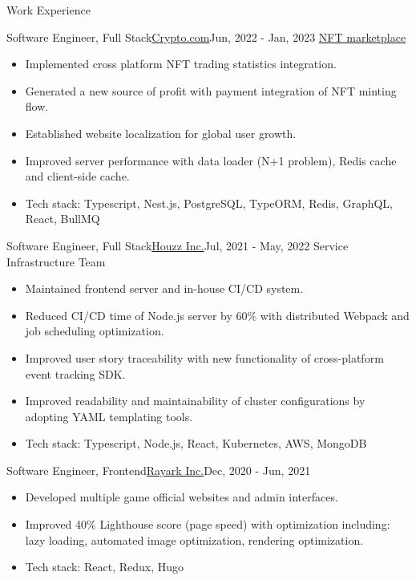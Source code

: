 \documentclass[]{mcdowellcv}
\begin{document}
	\begin{cvsection}{Work Experience}
		\begin{cvsubsection}{Software Engineer, Full Stack}{\href{https://crypto.com/}{Crypto.com}}{Jun, 2022 - Jan, 2023}
			\href{https://crypto.com/nft}{NFT marketplace}
			\begin{itemize}
				\item Implemented cross platform NFT trading statistics integration.
				\item Generated a new source of profit with payment integration of NFT minting flow.
				\item Established website localization for global user growth.
				\item Improved server performance with data loader (N+1 problem), Redis cache and client-side cache.
				\item Tech stack: Typescript, Nest.js, PostgreSQL, TypeORM, Redis, GraphQL, React, BullMQ
			\end{itemize}
		\end{cvsubsection}
		
		\begin{cvsubsection}{Software Engineer, Full Stack}{\href{https://www.houzz.com/}{Houzz Inc.}}{Jul, 2021 - May, 2022}	
			Service Infrastructure Team
			\begin{itemize}
				\item Maintained frontend server and in-house CI/CD system.
				\item Reduced CI/CD time of Node.js server by 60\% with distributed Webpack and job scheduling optimization.
				\item Improved user story traceability with new functionality of cross-platform event tracking SDK.
				\item Improved readability and maintainability of cluster configurations by adopting YAML templating tools.
				\item Tech stack: Typescript, Node.js, React, Kubernetes, AWS, MongoDB
			\end{itemize}
		\end{cvsubsection}
		
		\begin{cvsubsection}{Software Engineer, Frontend}{\href{https://rayark.com/}{Rayark Inc.}}{Dec, 2020 - Jun, 2021}		
			\begin{itemize}
				\item Developed multiple game official websites and admin interfaces.
				\item Improved 40\% Lighthouse score (page speed) with optimization including: lazy loading, automated image optimization, rendering optimization.
				\item Tech stack: React, Redux, Hugo
			\end{itemize}
		\end{cvsubsection}
		

\end{cvsection}
\end{document}
